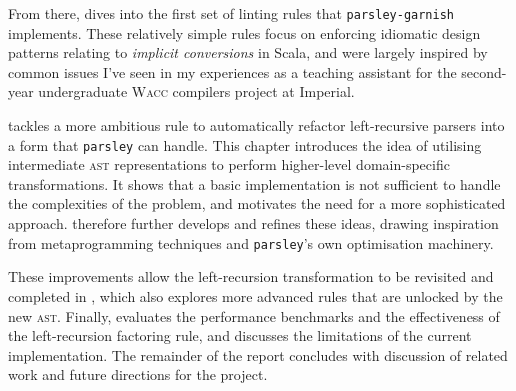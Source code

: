 \documentclass[../../main.tex]{subfiles}
\begin{document}
From there,  dives into the first set of linting rules that \texttt{parsley-garnish} implements.
These relatively simple rules focus on enforcing idiomatic design patterns relating to \emph{implicit conversions} in Scala, and were largely inspired by common issues I've seen in my experiences as a teaching assistant for the second-year undergraduate \textsc{Wacc} compilers project at Imperial.

 tackles a more ambitious rule to automatically refactor left-recursive parsers into a form that \texttt{parsley} can handle.
This chapter introduces the idea of utilising intermediate \textsc{ast} representations to perform higher-level domain-specific transformations.
It shows that a basic implementation is not sufficient to handle the complexities of the problem, and motivates the need for a more sophisticated approach.
 therefore further develops and refines these ideas, drawing inspiration from metaprogramming techniques and \texttt{parsley}'s own optimisation machinery.

These improvements allow the left-recursion transformation to be revisited and completed in , which also explores more advanced rules that are unlocked by the new \textsc{ast}.
Finally,  evaluates the performance benchmarks and the effectiveness of the left-recursion factoring rule, and discusses the limitations of the current implementation.
The remainder of the report concludes with discussion of related work and future directions for the project.
\end{document}
